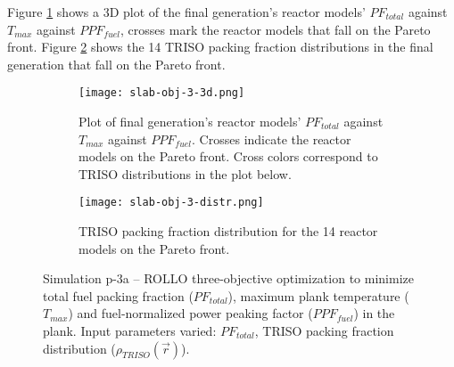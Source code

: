 Figure \ref{fig:slab-obj-3-3d} shows a 3D plot of the final generation's reactor models' 
$PF_{total}$ against $T_{max}$ against $PPF_{fuel}$, crosses mark the reactor models 
that fall on the Pareto front.
Figure \ref{fig:slab-obj-3-distr} shows the 14 TRISO packing fraction distributions in 
the final generation that fall on the Pareto front. 
\begin{figure}[htbp!]
    \begin{subfigure}{\textwidth}
        \centering
        \texttt{[image: slab-obj-3-3d.png]}
        \caption{Plot of final generation's reactor models' $PF_{total}$ against 
        $T_{max}$ against $PPF_{fuel}$. Crosses indicate the reactor models on the 
        Pareto front. Cross colors correspond to TRISO distributions in the plot below.}
        \label{fig:slab-obj-3-3d} 
    \end{subfigure}
    \begin{subfigure}{\textwidth}
        \texttt{[image: slab-obj-3-distr.png]}
        \caption{TRISO packing fraction distribution for the 14 reactor models on the Pareto front.}
        \label{fig:slab-obj-3-distr} 
    \end{subfigure}
    \caption{Simulation p-3a -- ROLLO three-objective optimization to minimize total 
    fuel packing fraction ($PF_{total}$), maximum plank temperature ($T_{max}$) and 
    fuel-normalized power peaking factor ($PPF_{fuel}$) in the plank. 
    Input parameters varied: $PF_{total}$, TRISO packing fraction distribution
    ($\rho_{TRISO}(\vec{r})$).}
    \label{fig:slab-obj-3}
\end{figure}

